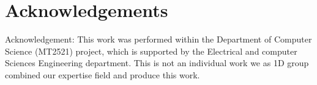 \section*{Acknowledgements}
  \begin{frame}
    \begin{center}
{\footnotesize Acknowledgement: This work was performed within the Department of Computer Science (MT2521)     project, which is supported by the Electrical and computer Sciences Engineering department. This is not an individual work we as 1D group combined our expertise field and produce this work.}
    \end{center}
\end{frame}
